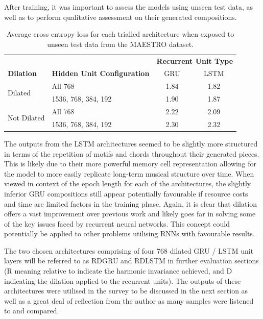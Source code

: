 \documentclass[12pt,]{article}
\begin{document}
After training, it was important to assess the models using unseen test
data, as well as to perform qualitative assessment on their generated
compositions.

\begin{table}[H]
\centering
\caption{Average cross entropy loss for each trialled architecture when exposed to unseen test data from the MAESTRO dataset.}
\vspace{1em}
\begin{tabular}{llcc} 
\toprule
                             &                                    & \multicolumn{2}{c}{\textbf{Recurrent Unit Type}}  \\
\textbf{Dilation}            & \textbf{Hidden Unit Configuration} & GRU   & LSTM                                      \\ 
\hline
\multirow{2}{*}{Dilated}     & All 768                            & 1.84  & 1.82                                      \\ 
                             & 1536, 768, 384, 192                & 1.90  & 1.87                                     \\ 
\multirow{2}{*}{Not Dilated} & All 768                            & 2.22  & 2.09                                     \\ 
                             & 1536, 768, 384, 192                & 2.30  & 2.32                                     \\
\bottomrule
\end{tabular}
\end{table}

The outputs from the LSTM architectures seemed to be slightly more
structured in terms of the repetition of motifs and chords throughout
their generated pieces. This is likely due to their more powerful memory
cell representation allowing for the model to more easily replicate
long-term musical structure over time. When viewed in context of the
epoch length for each of the architectures, the slightly inferior GRU
compositions still appear potentially favourable if resource costs and
time are limited factors in the training phase. Again, it is clear that
dilation offers a vast improvement over previous work and likely goes
far in solving some of the key issues faced by recurrent neural
networks. This concept could potentially be applied to other problems
utilising RNNs with favourable results.

The two chosen architectures comprising of four 768 dilated GRU / LSTM
unit layers will be referred to as RDGRU and RDLSTM in further
evaluation sections (R meaning relative to indicate the harmonic
invariance achieved, and D indicating the dilation applied to the
recurrent units). The outputs of these architectures were utilised in
the survey to be discussed in the next section as well as a great deal
of reflection from the author as many samples were listened to and
compared.
\end{document}
